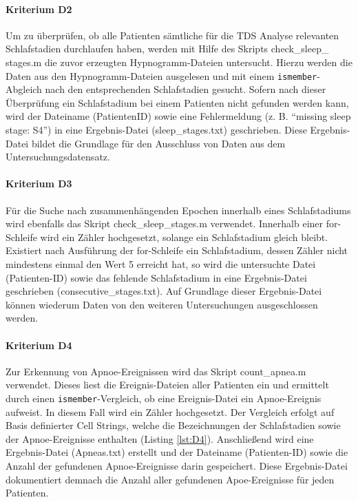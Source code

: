 \paragraph{Kriterium D2} Um zu überprüfen, ob alle Patienten sämtliche für die \acs{TDS} Analyse relevanten Schlafstadien durchlaufen haben, werden mit Hilfe des Skripts check\_sleep\_ stages.m die zuvor erzeugten Hypnogramm-Dateien untersucht. Hierzu werden die Daten aus den Hypnogramm-Dateien ausgelesen und mit einem \texttt{ismember}-Abgleich nach den entsprechenden Schlafstadien gesucht. Sofern nach dieser Überprüfung ein Schlafstadium bei einem Patienten nicht gefunden werden kann, wird der Dateiname (PatientenID) sowie eine Fehlermeldung (z. B. "`missing sleep stage: S4"') in eine Ergebnis-Datei (sleep\_stages.txt) geschrieben. Diese Ergebnis-Datei bildet die Grundlage für den Ausschluss von Daten aus dem Untersuchungsdatensatz.

\paragraph{Kriterium D3} Für die Suche nach zusammenhängenden Epochen innerhalb eines Schlafstadiums wird ebenfalls das Skript check\_sleep\_stages.m verwendet. Innerhalb einer for-Schleife wird ein Zähler hochgesetzt, solange ein Schlafstadium gleich bleibt. Existiert nach Ausführung der for-Schleife ein Schlafstadium, dessen Zähler nicht mindestens einmal den Wert 5 erreicht hat, so wird die untersuchte Datei (Patienten-ID) sowie das fehlende Schlafstadium in eine Ergebnis-Datei geschrieben (consecutive\_stages.txt). Auf Grundlage dieser Ergebnis-Datei können wiederum Daten von den weiteren Untersuchungen ausgeschlossen werden.

\paragraph{Kriterium D4} Zur Erkennung von Apnoe-Ereignissen wird das Skript count\_apnea.m verwendet. Dieses liest die Ereignis-Dateien aller Patienten ein und ermittelt durch einen \texttt{ismember}-Vergleich, ob eine Ereignis-Datei ein Apnoe-Ereignis aufweist. In diesem Fall wird ein Zähler hochgesetzt. Der Vergleich erfolgt auf Basis definierter Cell Strings, welche die Bezeichnungen der Schlafstadien sowie der Apnoe-Ereignisse enthalten (Listing \ref{lst:D4}). Anschließend wird eine Ergebnis-Datei (Apneas.txt) erstellt und der Dateiname (Patienten-ID) sowie die Anzahl der gefundenen Apnoe-Ereignisse darin gespeichert. Diese Ergebnis-Datei dokumentiert demnach die Anzahl aller gefundenen Apoe-Ereignisse für jeden Patienten.\\

